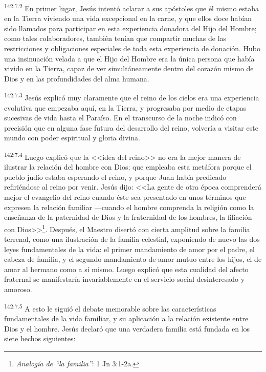 \par 
\textsuperscript{142:7.2} En primer lugar, Jesús intentó aclarar a sus apóstoles que él mismo estaba en la Tierra viviendo una vida excepcional en la carne, y que ellos doce habían sido llamados para participar en esta experiencia donadora del Hijo del Hombre; como tales colaboradores, también tenían que compartir muchas de las restricciones y obligaciones especiales de toda esta experiencia de donación. Hubo una insinuación velada a que el Hijo del Hombre era la única persona que había vivido en la Tierra, capaz de ver simultáneamente dentro del corazón mismo de Dios y en las profundidades del alma humana.

\par 
\textsuperscript{142:7.3} Jesús explicó muy claramente que el reino de los cielos era una experiencia evolutiva que empezaba aquí, en la Tierra, y progresaba por medio de etapas sucesivas de vida hasta el Paraíso. En el transcurso de la noche indicó con precisión que en alguna fase futura del desarrollo del reino, volvería a visitar este mundo con poder espiritual y gloria divina.

\par 
\textsuperscript{142:7.4} Luego explicó que la <<idea del reino>> no era la mejor manera de ilustrar la relación del hombre con Dios; que empleaba esta metáfora porque el pueblo judío estaba esperando el reino, y porque Juan había predicado refiriéndose al reino por venir. Jesús dijo: <<La gente de otra época comprenderá mejor el evangelio del reino cuando éste sea presentado en unos términos que expresen la relación familiar ---cuando el hombre comprenda la religión como la enseñanza de la paternidad de Dios y la fraternidad de los hombres, la filiación con Dios>>\footnote{\textit{Analogía de ``la familia''}: 1 Jn 3:1-2a.}. Después, el Maestro disertó con cierta amplitud sobre la familia terrenal, como una ilustración de la familia celestial, exponiendo de nuevo las dos leyes fundamentales de la vida: el primer mandamiento de amor por el padre, el cabeza de familia, y el segundo mandamiento de amor mutuo entre los hijos, el de amar al hermano como a sí mismo. Luego explicó que esta cualidad del afecto fraternal se manifestaría invariablemente en el servicio social desinteresado y amoroso.

\par 
\textsuperscript{142:7.5} A esto le siguió el debate memorable sobre las características fundamentales de la vida familiar, y su aplicación a la relación existente entre Dios y el hombre. Jesús declaró que una verdadera familia está fundada en los siete hechos siguientes:

